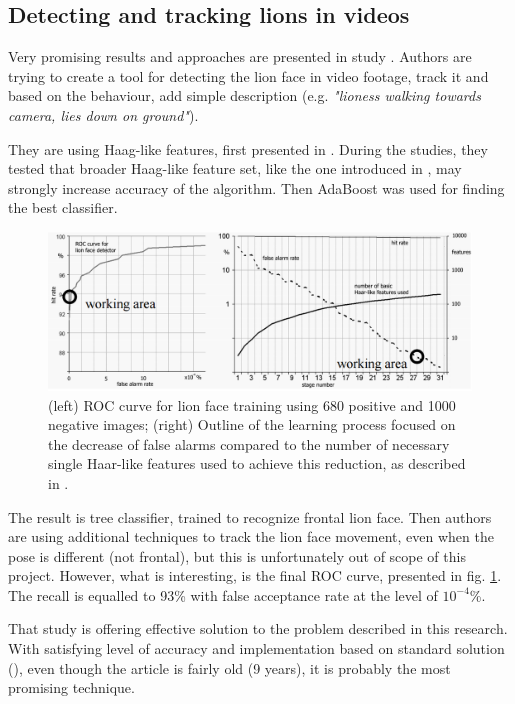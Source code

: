 \documentclass[hyperref]{acmtrans2e}
\begin{document}
\subsection{Detecting and tracking lions in videos}
\label{sec:lions}
Very promising results and approaches are presented in study \cite{lions:2006}. Authors are trying to create a tool for detecting the lion face in video footage, track it and based on the behaviour, add simple description (e.g. \emph{"lioness walking towards camera, lies down on ground"}). 

They are using Haag-like features, first presented in \cite{viola:2001}. During the studies, they tested that broader Haag-like feature set, like the one introduced in \cite{better:2002}, may strongly increase accuracy of the algorithm. Then AdaBoost was used for finding the best classifier.
\begin{figure}[h]
\centering
    \includegraphics[width=1\textwidth]{roc_lions}
  \caption{(left) ROC curve for lion face training using 680 positive and 1000 negative images; (right) Outline of the learning process focused on the decrease of false alarms compared to the number of necessary single Haar-like features
used to achieve this reduction, as described in \protect\cite{lions:2006}.}
  \label{fig:roc_lions}
\end{figure}

The result is tree classifier, trained to recognize frontal lion face. Then authors are using additional techniques to track the lion face movement, even when the pose is different (not frontal), but this is unfortunately out of scope of this project. However, what is interesting, is the final ROC curve, presented in fig. \ref{fig:roc_lions}. The recall is equalled to 93\% with false acceptance rate at the level of $10^{-4}$\%. 	

That study is offering effective solution to the problem described in this research. With satisfying level of accuracy and implementation based on standard solution (\cite{viola:2001}), even though the article is fairly old (9 years), it is probably the most promising technique. 
\end{document}
